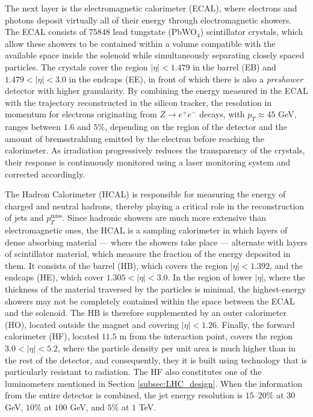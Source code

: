 The next layer is the electromagnetic calorimeter (ECAL), where electrons and photons deposit virtually all of their energy through electromagnetic showers. The ECAL consists of $75848$ lead tungstate (PbWO$_4$) scintillator crystals, which allow these showers to be contained within a volume compatible with the available space inside the solenoid while simultaneously separating closely spaced particles. The crystals cover the region $|\eta|<1.479$ in the barrel (EB) and $1.479<|\eta|<3.0$ in the endcaps (EE), in front of which there is also a \textit{preshower} detector with higher granularity. By combining the energy measured in the ECAL with the trajectory reconstructed in the silicon tracker, the resolution in momentum for electrons originating from $Z\to e^+e^-$ decays, with $p_T\approx45$ GeV, ranges between $1.6$ and $5\%$, depending on the region of the detector and the amount of bremsstrahlung emitted by the electron before reaching the calorimeter. As irradiation progressively reduces the transparency of the crystals, their response is continuously monitored using a laser monitoring system and corrected accordingly.

The Hadron Calorimeter (HCAL) is responsible for measuring the energy of charged and neutral hadrons, thereby playing a critical role in the reconstruction of jets and $p_T^\text{miss}$. Since hadronic showers are much more extensive than electromagnetic ones, the HCAL is a sampling calorimeter in which layers of dense absorbing material — where the showers take place — alternate with layers of scintillator material, which measure the fraction of the energy deposited in them. It consists of the barrel (HB), which covers the region $|\eta|<1.392$, and the endcaps (HE), which cover $1.305<|\eta|<3.0$. In the region of lower $|\eta|$, where the thickness of the material traversed by the particles is minimal, the highest-energy showers may not be completely contained within the space between the ECAL and the solenoid. The HB is therefore supplemented by an outer calorimeter (HO), located outside the magnet and covering $|\eta|<1.26$. Finally, the forward calorimeter (HF), located $11.5$ m from the interaction point, covers the region $3.0<|\eta|<5.2$, where the particle density per unit area is much higher than in the rest of the detector, and consequently, they it is built using technology that is particularly resistant to radiation. The HF also constitutes one of the luminometers mentioned in Section \ref{subsec:LHC_design}. When the information from the entire detector is combined, the jet energy resolution is $15$–$20\%$ at $30$ GeV, $10\%$ at $100$ GeV, and $5\%$ at $1$ TeV.

